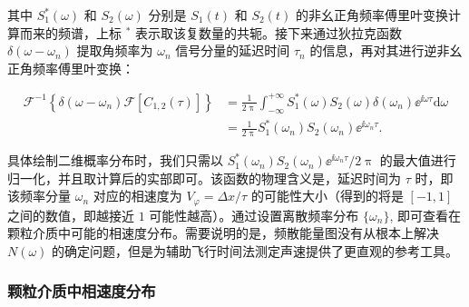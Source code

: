 其中 $S_{1}^{*}(\omega)$ 和 $S_{2}(\omega)$ 分别是 $S_{1}(t)$ 和 $S_{2}(t)$ 的非幺正角频率傅里叶变换计算而来的频谱，上标 $^{*}$ 表示取该复数量的共轭。接下来通过狄拉克函数 $\delta(\omega-\omega_{n})$ 提取角频率为 $\omega_{n}$ 信号分量的延迟时间 $\tau_{n}$ 的信息，再对其进行逆非幺正角频率傅里叶变换：

\begin{align}
  \mathcal{F}^{-1}\left\{\delta(\omega-\omega_{n})\mathcal{F}[C_{1,2}(\tau)]\right\} &= \frac{1}{2\uppi}\int_{-\infty}^{+\infty}S_{1}^{*}(\omega)S_{2}(\omega)\delta(\omega_{n}){\ee}^{\ii\omega\tau}\mathrm{d}\omega \nonumber \\
  &= \frac{1}{2\uppi}S_{1}^{*}(\omega_{n})S_{2}(\omega_{n}){\ee}^{\ii\omega_{n}\tau}.
\end{align}

具体绘制二维概率分布时，我们只需以 $S_{1}^{*}(\omega_{n})S_{2}(\omega_{n}){\ee}^{\ii\omega_{n}\tau}/2\uppi$ 的最大值进行归一化，并且取计算后的实部即可。该函数的物理含义是，延迟时间为 $\tau$ 时，即该频率分量 $\omega_{n}$ 对应的相速度为 $V_{\varphi} = \Delta x/\tau$ 的可能性大小（得到的将是 $[-1,1]$ 之间的数值，即越接近 $1$ 可能性越高）。通过设置离散频率分布 $\{\omega_{n}\}$, 即可查看在颗粒介质中可能的相速度分布。需要说明的是，频散能量图没有从根本上解决 $N(\omega)$ 的确定问题，但是为辅助飞行时间法测定声速提供了更直观的参考工具。

\subsubsection{颗粒介质中相速度分布}


